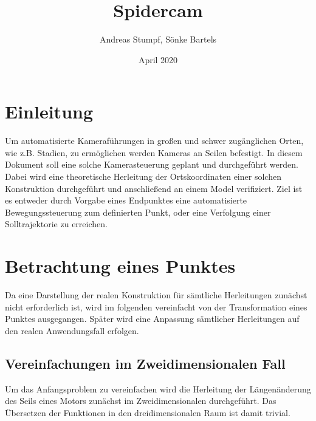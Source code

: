 \documentclass[a4paper, 12pt]{article}
\title{Spidercam}
\date{April 2020}
\author{Andreas Stumpf, Sönke Bartels}
\begin{document}
	\maketitle
	\newpage
	\tableofcontents
	\listoffigures
	\pagebreak
	\section{Einleitung}
	Um automatisierte Kameraführungen in großen und schwer zugänglichen Orten, wie z.B. Stadien, zu ermöglichen werden Kameras an Seilen befestigt.
	In diesem Dokument soll eine solche Kamerasteuerung geplant und durchgeführt werden.
	Dabei wird eine theoretische Herleitung der Ortskoordinaten einer solchen Konstruktion durchgeführt und anschließend an einem Model verifiziert.
	Ziel ist es entweder durch Vorgabe eines Endpunktes eine automatisierte Bewegungssteuerung zum definierten Punkt, oder eine Verfolgung einer Solltrajektorie zu erreichen.
	\pagebreak
	\section{Betrachtung eines Punktes}
		Da eine Darstellung der realen Konstruktion für sämtliche Herleitungen zunächst nicht erforderlich ist, wird im folgenden vereinfacht von der Transformation eines Punktes ausgegangen. Später wird eine Anpassung sämtlicher Herleitungen auf den realen Anwendungsfall erfolgen.
		\subsection{Vereinfachungen im Zweidimensionalen Fall}
		Um das Anfangsproblem zu vereinfachen wird die Herleitung der Längenänderung des Seils eines Motors zunächst im Zweidimensionalen durchgeführt. Das Übersetzen der Funktionen in den dreidimensionalen Raum ist damit trivial.
			\pagebreak
\end{document}
